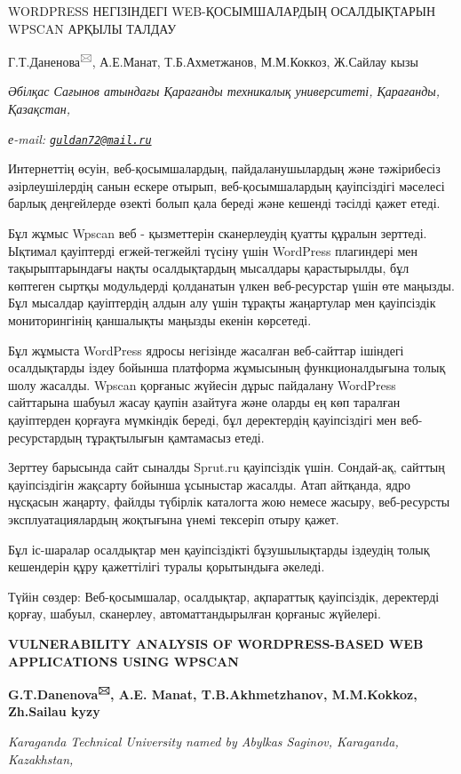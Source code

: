 \documentclass[
]{article}
\begin{document}
WORDPRESS НЕГІЗІНДЕГІ WEB-ҚОСЫМШАЛАРДЫҢ ОСАЛДЫҚТАРЫН WPSCAN АРҚЫЛЫ
ТАЛДАУ

Г.Т.Даненова\textsuperscript{🖂}, А.Е.Манат, Т.Б.Ахметжанов, М.М.Коккоз,
Ж.Сайлау кызы

\emph{Әбілқас Сағынов атындағы Қарағанды техникалық университеті,
Қарағанды, Қазақстан,}

\emph{е-mail:
\href{mailto:guldan72@mail.ru}{\nolinkurl{guldan72@mail.ru}}}

Интернеттің өсуін, веб-қосымшалардың, пайдаланушылардың және тәжірибесіз
әзірлеушілердің санын ескере отырып, веб-қосымшалардың қауіпсіздігі
мәселесі барлық деңгейлерде өзекті болып қала береді және кешенді
тәсілді қажет етеді.

Бұл жұмыс Wpscan веб - қызметтерін сканерлеудің қуатты құралын зерттеді.
Ықтимал қауіптерді егжей-тегжейлі түсіну үшін WordPress плагиндері мен
тақырыптарындағы нақты осалдықтардың мысалдары қарастырылды, бұл
көптеген сыртқы модульдерді қолданатын үлкен веб-ресурстар үшін өте
маңызды. Бұл мысалдар қауіптердің алдын алу үшін тұрақты жаңартулар мен
қауіпсіздік мониторингінің қаншалықты маңызды екенін көрсетеді.

Бұл жұмыста WordPress ядросы негізінде жасалған веб-сайттар ішіндегі
осалдықтарды іздеу бойынша платформа жұмысының функционалдығына толық
шолу жасалды. Wpscan қорғаныс жүйесін дұрыс пайдалану WordPress
сайттарына шабуыл жасау қаупін азайтуға және оларды ең көп таралған
қауіптерден қорғауға мүмкіндік береді, бұл деректердің қауіпсіздігі мен
веб-ресурстардың тұрақтылығын қамтамасыз етеді.

Зерттеу барысында сайт сыналды Sprut.ru қауіпсіздік үшін. Сондай-ақ,
сайттың қауіпсіздігін жақсарту бойынша ұсыныстар жасалды. Атап айтқанда,
ядро нұсқасын жаңарту, файлды түбірлік каталогта жою немесе жасыру,
веб-ресурсты эксплуатациялардың жоқтығына үнемі тексеріп отыру қажет.

Бұл іс-шаралар осалдықтар мен қауіпсіздікті бұзушылықтарды іздеудің
толық кешендерін құру қажеттілігі туралы қорытындыға әкеледі.

Түйін сөздер: Веб-қосымшалар, осалдықтар, ақпараттық қауіпсіздік,
деректерді қорғау, шабуыл, сканерлеу, автоматтандырылған қорғаныс
жүйелері.

\textbf{VULNERABILITY ANALYSIS OF WORDPRESS-BASED WEB APPLICATIONS USING
WPSCAN}

\textbf{G.T.Danenova\textsuperscript{🖂}, A.E. Manat, T.B.Akhmetzhanov,
M.M.Kokkoz, Zh.Sailau kyzy}

\emph{Karaganda Technical University named by Abylkas Saginov,
Karaganda, Kazakhstan,}
\end{document}
